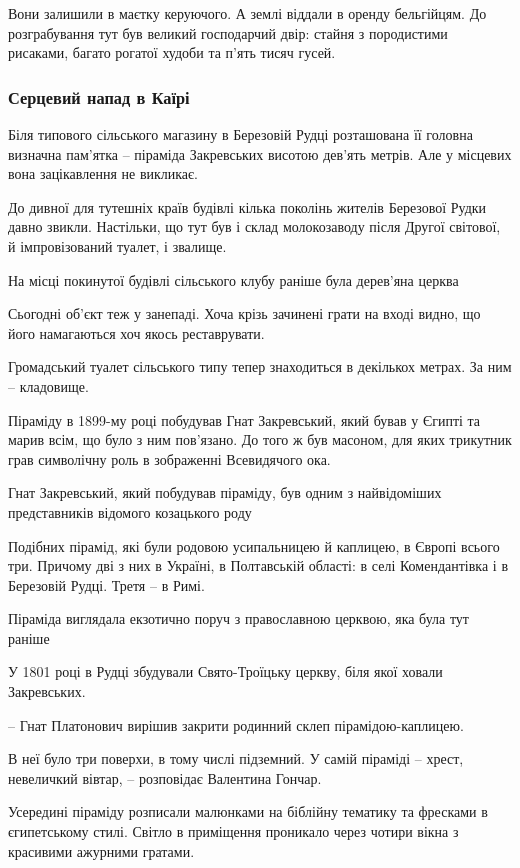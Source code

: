 Вони залишили в маєтку керуючого. А землі віддали в оренду бельгійцям. До
розграбування тут був великий господарчий двір: стайня з породистими рисаками,
багато рогатої худоби та п’ять тисяч гусей.
  
\subsubsection{Серцевий напад в Каїрі}

Біля типового сільського магазину в Березовій Рудці розташована її головна
визначна пам'ятка –  піраміда Закревських висотою дев'ять метрів. Але у
місцевих вона зацікавлення не викликає.

До дивної для тутешніх країв будівлі кілька поколінь жителів Березової Рудки
давно звикли. Настільки, що тут був і склад молокозаводу після Другої світової,
й імпровізований туалет, і звалище.

На місці покинутої будівлі сільського клубу раніше була дерев'яна церква

Сьогодні об'єкт теж у занепаді. Хоча крізь зачинені грати на вході видно, що
його намагаються хоч якось реставрувати.

Громадський туалет сільського типу тепер знаходиться в декількох метрах. За ним
– кладовище.

Піраміду в 1899-му році побудував Гнат Закревський, який бував у Єгипті та
марив всім, що було з ним пов'язано. До того ж був масоном, для яких трикутник
грав символічну роль в зображенні Всевидячого ока.

Гнат Закревський, який побудував піраміду, був одним з найвідоміших
представників відомого козацького роду

Подібних пірамід, які були родовою усипальницею й каплицею, в Європі всього
три. Причому дві з них в Україні, в Полтавській області: в селі Комендантівка і
в Березовій Рудці. Третя – в Римі.

Піраміда виглядала екзотично поруч з православною церквою, яка була тут раніше

У 1801 році в Рудці збудували Свято-Троїцьку церкву, біля якої ховали
Закревських.

– Гнат Платонович вирішив закрити родинний склеп пірамідою-каплицею. 

В неї було три поверхи, в тому числі підземний. У самій піраміді – хрест,
невеличкий вівтар, – розповідає Валентина Гончар.

Усередині піраміду розписали малюнками на біблійну тематику та фресками в
єгипетському стилі. Світло в приміщення проникало через чотири вікна з
красивими ажурними гратами.

